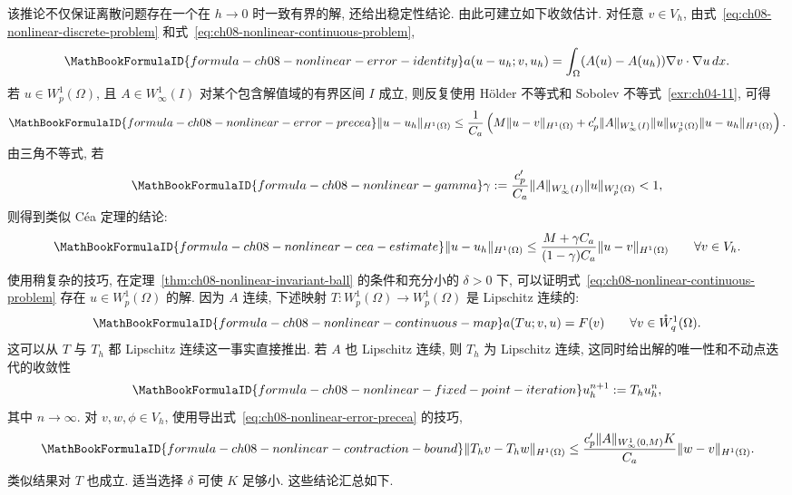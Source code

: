 该推论不仅保证离散问题存在一个在 $h\to0$ 时一致有界的解, 还给出稳定性结论. 由此可建立如下收敛估计. 对任意 $v\in V_h$, 由式~\eqref{eq:ch08-nonlinear-discrete-problem} 和式~\eqref{eq:ch08-nonlinear-continuous-problem},
\[
\MathBookFormulaID{formula-ch08-nonlinear-error-identity}
a(u-u_h;v,u_h)=\int_\Omega(A(u)-A(u_h))\nabla v\cdot\nabla u\,dx.
\]
若 $u\in W_p^1(\Omega)$, 且 $A\in W_\infty^1(I)$ 对某个包含解值域的有界区间 $I$ 成立, 则反复使用 Hölder 不等式和 Sobolev 不等式~\ref{exr:ch04-11}, 可得
\begin{equation}
\MathBookFormulaID{formula-ch08-nonlinear-error-precea}
\label{eq:ch08-nonlinear-error-precea}
\|u-u_h\|_{H^1(\Omega)}
\leq\frac1{C_a}\left(M\|u-v\|_{H^1(\Omega)}
+c_p'\|A\|_{W_\infty^1(I)}\|u\|_{W_p^1(\Omega)}\|u-u_h\|_{H^1(\Omega)}\right).
\end{equation}
由三角不等式, 若
\[
\MathBookFormulaID{formula-ch08-nonlinear-gamma}
\gamma:=\frac{c_p'}{C_a}\|A\|_{W_\infty^1(I)}\|u\|_{W_p^1(\Omega)}<1,
\]
则得到类似 Céa 定理的结论:
\begin{equation}
\MathBookFormulaID{formula-ch08-nonlinear-cea-estimate}
\label{eq:ch08-nonlinear-cea-estimate}
\|u-u_h\|_{H^1(\Omega)}
\leq\frac{M+\gamma C_a}{(1-\gamma)C_a}\|u-v\|_{H^1(\Omega)}
\qquad\forall v\in V_h.
\end{equation}
使用稍复杂的技巧, 在定理~\ref{thm:ch08-nonlinear-invariant-ball} 的条件和充分小的 $\delta>0$ 下, 可以证明式~\eqref{eq:ch08-nonlinear-continuous-problem} 存在 $u\in W_p^1(\Omega)$ 的解. 因为 $A$ 连续, 下述映射 $T:W_p^1(\Omega)\to W_p^1(\Omega)$ 是 Lipschitz 连续的:
\[
\MathBookFormulaID{formula-ch08-nonlinear-continuous-map}
a(Tu;v,u)=F(v)
\qquad\forall v\in\mathring W_q^1(\Omega).
\]
这可以从 $T$ 与 $T_h$ 都 Lipschitz 连续这一事实直接推出. 若 $A$ 也 Lipschitz 连续, 则 $T_h$ 为 Lipschitz 连续, 这同时给出解的唯一性和不动点迭代的收敛性
\begin{equation}
\MathBookFormulaID{formula-ch08-nonlinear-fixed-point-iteration}
\label{eq:ch08-nonlinear-fixed-point-iteration}
u_h^{n+1}:=T_hu_h^n,
\end{equation}
其中 $n\to\infty$. 对 $v,w,\phi\in V_h$, 使用导出式~\eqref{eq:ch08-nonlinear-error-precea} 的技巧,
\begin{equation}
\MathBookFormulaID{formula-ch08-nonlinear-contraction-bound}
\label{eq:ch08-nonlinear-contraction-bound}
\|T_hv-T_hw\|_{H^1(\Omega)}
\leq\frac{c_p'\|A\|_{W_\infty^1(0,M)}K}{C_a}\|w-v\|_{H^1(\Omega)}.
\end{equation}
类似结果对 $T$ 也成立. 适当选择 $\delta$ 可使 $K$ 足够小. 这些结论汇总如下.


